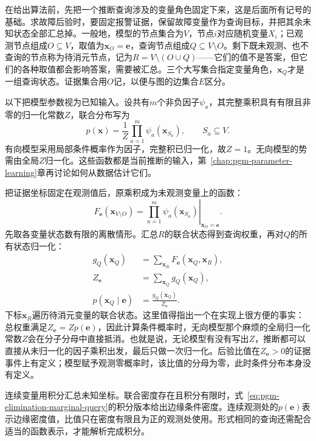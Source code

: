 在给出算法前，先把一个推断查询涉及的变量角色固定下来，这是后面所有记号的基础。求故障后验时，要固定报警证据，保留故障变量作为查询目标，并把其余未知状态全部汇总掉。一般地，模型的节点集合为$V$，节点$i$对应随机变量$X_i$；已观测节点组成$O\subseteq V$，取值为$\bm{x}_O=\bm{e}$，查询节点组成$Q\subseteq V\setminus O$。剩下既未观测、也不查询的节点称为待消元节点，记为$R=V\setminus(O\cup Q)$——它们的值不是答案，但它们的各种取值都会影响答案，需要被汇总。三个大写集合指定变量角色，$\bm{x}_Q$才是一组查询状态。证据集合用$O$记，以便与图的边集合$E$区分。

以下把模型参数视为已知输入。设共有$m$个非负因子$\psi_a$，其完整乘积具有有限且非零的归一化常数$Z$，联合分布写为
\begin{equation}
  p(\bm{x})=\frac{1}{Z}\prod_{a=1}^{m}\psi_a(\bm{x}_{S_a}),
  \qquad S_a\subseteq V.
  \label{eq:pgm-elimination-factorization}
\end{equation}
有向模型采用局部条件概率作为因子，完整积已归一化，故$Z=1$。无向模型的势需由全局$Z$归一化。这些函数都是当前推断的输入，第~\ref{chap:pgm-parameter-learning}章再讨论如何从数据估计它们。

把证据坐标固定在观测值后，原乘积成为未观测变量上的函数：
\begin{equation}
  F_{\bm{e}}(\bm{x}_{V\setminus O})
  =\left.\prod_{a=1}^{m}\psi_a(\bm{x}_{S_a})
  \right|_{\bm{x}_O=\bm{e}}.
  \label{eq:pgm-elimination-evidence-function}
\end{equation}
先取各变量状态数有限的离散情形。汇总$R$的联合状态得到查询权重，再对$Q$的所有状态归一化：
\begin{equation}
  \begin{aligned}
    g_Q(\bm{x}_Q)
      &=\sum_{\bm{x}_R}F_{\bm{e}}(\bm{x}_Q,\bm{x}_R),\\
    Z_{\bm{e}}&=\sum_{\bm{x}_Q}g_Q(\bm{x}_Q),\\
    p(\bm{x}_Q\mid\bm{e})&=\frac{g_Q(\bm{x}_Q)}{Z_{\bm{e}}}.
  \end{aligned}
  \label{eq:pgm-elimination-marginal-query}
\end{equation}
下标$\bm{x}_R$遍历待消元变量的联合状态。这里值得指出一个在实现上很方便的事实：总权重满足$Z_{\bm{e}}=Zp(\bm{e})$，因此计算条件概率时，无向模型那个麻烦的全局归一化常数$Z$会在分子分母中直接抵消。也就是说，无论模型有没有写出$Z$，推断都可以直接从未归一化的因子乘积出发，最后只做一次归一化。后验比值在$Z_{\bm{e}}>0$的证据事件上有定义；模型赋予观测零概率时，该比值的分母为零，此时条件分布本身没有定义。

连续变量用积分汇总未知坐标。联合密度存在且积分有限时，式~\eqref{eq:pgm-elimination-marginal-query}的积分版本给出边缘条件密度。连续观测处的$p(\bm{e})$表示边缘密度值，比值只在密度有限且为正的观测处使用。形式相同的查询还需配合适当的函数表示，才能解析完成积分。

